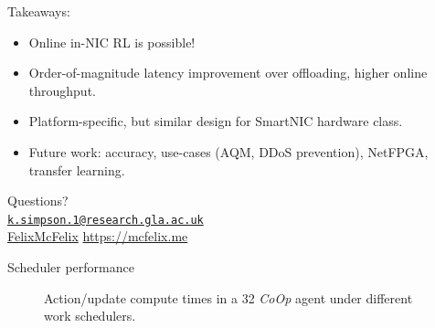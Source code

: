 \documentclass[aspectratio=169,xcolor={dvipsnames}
,handout
]{beamer}
\newcommand{\Coopfw}{\emph{CoOp}}
\begin{document}
\begin{frame}[standout]
	Takeaways:
	\begin{itemize}
		\item \alert{Online in-NIC RL is possible!}
		\item \alert{Order-of-magnitude latency improvement} over offloading, higher online throughput.
		\item Platform-specific, but similar design for SmartNIC hardware class.
		\item \alert{Future work}: accuracy, use-cases (AQM, DDoS prevention), NetFPGA, transfer learning.
	\end{itemize}
	\alert{Questions?}\\
	{
		\scriptsize
		\vspace{2em}\faEnvelopeO{} \href{mailto:k.simpson.1@research.gla.ac.uk}{\nolinkurl{k.simpson.1@research.gla.ac.uk}}\\
		\vspace{-0.8em}	\small{\faGithub{} \href{https://github.com/felixmcfelix}{FelixMcFelix} \hspace{0.5em} \faGlobe{} \url{https://mcfelix.me}}
	}
\end{frame}

\appendix

\begin{frame}{Scheduler performance}
	\begin{figure}
		\caption{Action/update compute times in a \SI{32}{\bit} \Coopfw{} agent under different work schedulers.\label{fig:work-alloc-32}}
	\end{figure}
\end{frame}
\end{document}
